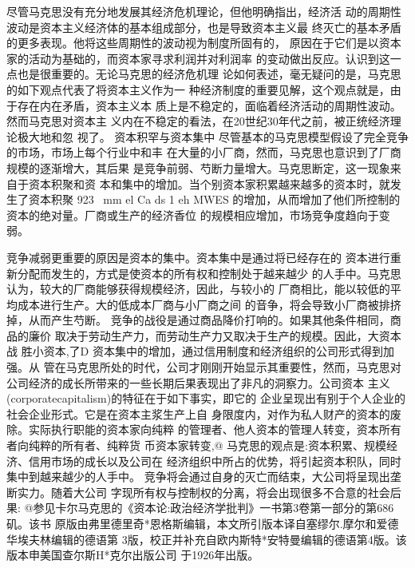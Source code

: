 尽管马克思没有充分地发展其经济危机理论，但他明确指出，经济活
动的周期性波动是资本主义经济体的基本组成部分，也是导致资本主义最
终灭亡的基本矛盾的更多表现。他将这些周期性的波动视为制度所固有的，
原因在于它们是以资本家的活动为基础的，而资本家寻求利润并对利润率
的变动做出反应。认识到这一点也是很重要的。无论马克思的经济危机理
论如何表述，毫无疑问的是，马克思的如下观点代表了将资本主义作为一
种经济制度的重要见解，这个观点就是，由于存在内在矛盾，资本主义本
质上是不稳定的，面临着经济活动的周期性波动。然而马克思对资本主
义内在不稳定的看法，在20世纪30年代之前，被正统经济理论极大地和忽
视了。
资本积罕与资本集中
尽管基本的马克思模型假设了完全竞争的市场，市场上每个行业中和丰
在大量的小厂商，然而，马克思也意识到了厂商规模的逐渐增大，其后果
是竞争前弱、芍断力量增大。马克思断定，这一现象来自于资本积聚和资
本和集中的增加。当个别资本家积累越来越多的资本时，就发生了资本积聚
923
~mm
el
Ca
ds
1
eh
MWES
的增加，从而增加了他们所控制的资本的绝对量。厂商或生产的经济香位
的规模相应增加，市场竞争度趋向于变弱。

竞争减弱更重要的原因是资本的集中。资本集中是通过将已经存在的
资本进行重新分配而发生的，方式是使资本的所有权和控制处于越来越少
的人手中。马克思认为，较大的厂商能够获得规模经济，因此，与较小的
厂商相比，能以较低的平均成本进行生产。大的低成本厂商与小厂商之间
的音争，将会导致小厂商被排挤掉，从而产生芍断。
竞争的战役是通过商品降价打响的。如果其他条件相同，商品的廉价
取决于劳动生产力，而劳动生产力又取决于生产的规模。因此，大资本战
胜小资本,了D
资本集中的增加，通过信用制度和经济组织的公司形式得到加强。从
管在马克思所处的时代，公司才刚刚开始显示其重要性，然而，马克思对
公司经济的成长所带来的一些长期后果表现出了非凡的洞察力。公司资本
主义(corporatecapitalism)的特征在于如下事实，即它的
企业呈现出有别于个人企业的社会企业形式。它是在资本主浆生产上自
身限度内，对作为私人财产的资本的废除。实际执行职能的资本家向纯粹
的管理者、他人资本的管理人转变，资本所有者向纯粹的所有者、纯粹货
币资本家转变,@
马克思的观点是:资本积累、规模经济、信用市场的成长以及公司在
经济组织中所占的优势，将引起资本积队，同时集中到越来越少的人手中。
竞争将会通过自身的灭亡而结束，大公司将呈现出垄断实力。随着大公司
字现所有权与控制权的分离，将会出现很多不合意的社会后果:
@参见卡尔马克思的《资本论:政治经济学批判》一书第3卷第一部分的第686矶。该书
原版由弗里德里奇*恩格斯编辑，本文所引版本译自塞缪尔.摩尔和爱德华埃夫林编辑的德语第
3版，校正并补充自欧内斯特*安特曼编辑的德语第4版。该版本申美国查尔斯H*克尔出版公司
于1926年出版。




